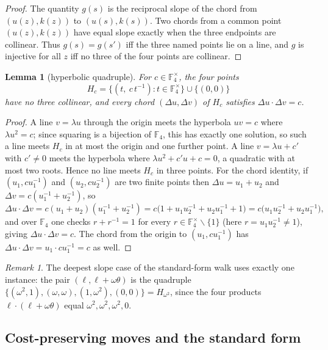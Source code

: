 \documentclass[11pt]{article}
\newcommand{\F}[1]{\mathbb{F}_{#1}}
\newcommand{\slab}{\ell}                          %
\theoremstyle{plain}
\newtheorem{lemma}{Lemma}[section]
\theoremstyle{definition}
\theoremstyle{remark}
\newtheorem*{remark}{Remark}
\begin{document}
\begin{proof}
The quantity $g(s)$ is the reciprocal slope of the chord from $(u(z),k(z))$ to
$(u(s),k(s))$. Two chords from a common point $(u(z),k(z))$ have equal slope
exactly when the three endpoints are collinear. Thus $g(s)=g(s')$ iff the three
named points lie on a line, and $g$ is injective for all $z$ iff no three of the
four points are collinear.
\end{proof}

\begin{lemma}[hyperbolic quadruple]\label{lem:hyperbolic}
For $c\in\F4^\times$, the four points
\[
  H_c=\{(t,\ c\,t^{-1}):t\in\F4^\times\}\cup\{(0,0)\}
\]
have no three collinear, and every chord $(\Delta u,\Delta v)$ of $H_c$ satisfies
$\Delta u\cdot\Delta v=c$.
\end{lemma}

\begin{proof}
A line $v=\lambda u$ through the origin meets the hyperbola $uv=c$ where
$\lambda u^2=c$; since squaring is a bijection of $\F4$, this has exactly one
solution, so such a line meets $H_c$ in at most the origin and one further point.
A line $v=\lambda u+c'$ with $c'\ne 0$ meets the hyperbola where
$\lambda u^2+c'u+c=0$, a quadratic with at most two roots. Hence no line meets
$H_c$ in three points. For the chord identity, if $(u_1,c u_1^{-1})$ and
$(u_2,c u_2^{-1})$ are two finite points then $\Delta u=u_1+u_2$ and
$\Delta v=c(u_1^{-1}+u_2^{-1})$, so
\[
  \Delta u\cdot\Delta v=c(u_1+u_2)(u_1^{-1}+u_2^{-1})
   =c\bigl(1+u_1u_2^{-1}+u_2u_1^{-1}+1\bigr)
   =c\bigl(u_1u_2^{-1}+u_2u_1^{-1}\bigr),
\]
and over $\F4$ one checks $r+r^{-1}=1$ for every $r\in\F4^\times\smallsetminus\{1\}$
(here $r=u_1u_2^{-1}\ne 1$), giving $\Delta u\cdot\Delta v=c$. The chord from the
origin to $(u_1,cu_1^{-1})$ has $\Delta u\cdot\Delta v=u_1\cdot cu_1^{-1}=c$ as
well.
\end{proof}

\begin{remark}
The deepest slope case of the standard-form walk uses exactly one instance: the
pair $(\slab,\slab+\omega\theta)$ is the quadruple
$\{(\omega^2,1),(\omega,\omega),(1,\omega^2),(0,0)\}=H_{\omega^2}$, since the four
products $\slab\cdot(\slab+\omega\theta)$ equal $\omega^2,\omega^2,\omega^2,0$.
\end{remark}

\subsection{Cost-preserving moves and the standard form}\label{ssec:stdform}
\end{document}
